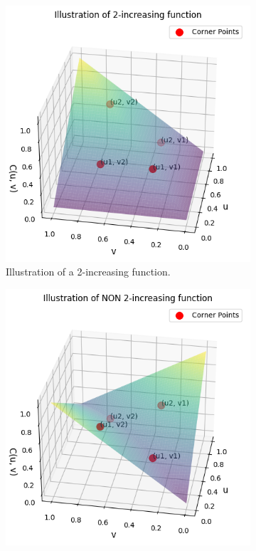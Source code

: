 \begin{figure}[h]
    \centering
    \begin{subfigure}[t]{0.45\linewidth}
        \centering
        \includegraphics[width=\linewidth]{3Theory/pictures/2Increasing.png}
        \caption{Illustration of a 2-increasing function.}
    \end{subfigure}
    \hfill
    \begin{subfigure}[t]{0.45\linewidth}
        \centering
        \includegraphics[width=\linewidth]{3Theory/pictures/Not2increasing.png}

\end{subfigure}
\end{figure}

